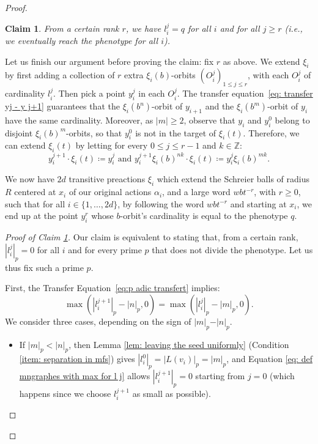 \documentclass[12pt]{article}
\numberwithin{equation}{section}
\newtheorem{claim}[equation]{Claim}
\theoremstyle{definition}
\newenvironment{cproofbis}[1]{\begin{proof}[#1]\renewcommand*{\qedsymbol}{\(\square_\text{claim}\)}}{\end{proof}}
\newcommand{\Z}{\mathbb{Z}}
\newcommand{\abs}[1]{\left\lvert #1\right\rvert}
\begin{document}
\begin{proof}
	
	
	
	
	
	\begin{claim} \label{claim: lij is stationary}
		From a certain rank $r$, we have $l_i^j = q$ for all $i$ and for all $j \geq r$ 
		(i.e., we eventually reach the phenotype for all $i$).
	\end{claim}
	Let us finish our argument before proving the claim: fix $r$ as above.
	We extend $\xi_i$ by first adding a collection of $r$ extra $\xi_i(b)$-orbits $(O_i^j)_{1\leq j\leq r}$, with each $O_i^j$  of cardinality $l_i^j$.
	Then pick a point $y_i^j$ in each $O_i^j$.
	The transfer equation~\eqref{eq: transfer yj - y j+1} guarantees that
	the $\xi_i(b^n)$-orbit of $y_{i+1}$ and the $\xi_i(b^m)$-orbit of $y_i$
	have the same cardinality.
	Moreover, as $\abs{m} \geq 2$, observe that $y_i$ and $y_i^0$ belong to disjoint $\xi_i(b)^m$-orbits, so that $y_i^0$ is not in the target of $\xi_i(t)$.
	Therefore, we can extend $\xi_i(t)$ by letting for every $0 \leq j \leq r-1$ and $k\in\Z$:
	\[
	y_i^{j+1}\cdot \xi_i(t) \coloneqq y_i^j  \text{\ \  and \ \ } y_i^{j+1}\xi_i(b)^{nk} \cdot \xi_i(t) \coloneqq y_i^j\xi_i(b)^{mk}.
	\]

	We now have $2d$ transitive preactions $\xi_i$ which extend 
	the Schreier balls of radius $R$ centered at $x_i$ of our original actions $\alpha_i$, 
	and a large word $wbt^{-r}$, with $r\geq 0$, 
	such that for all $i\in\{1,\dots,2d\}$, by following the word $wbt^{-r}$ and starting at $x_i$, 
	we end up at the point $y^r_i$ whose \( b \)-orbit's cardinality is equal to the phenotype $q$. 

	\begin{cproofbis}{Proof of Claim \ref{claim: lij is stationary}}
		Our claim is equivalent to stating that, from a certain rank, $\abs{l_i^j}_p = 0$ for all $i$ and for every prime $p$ that does not divide the phenotype. Let us thus fix 
		such a prime $p$.
		
		First, the Transfer Equation~\eqref{eq:p adic transfert} implies:
		\begin{equation}\label{eq: def mngraphes with max for l j}
			\max(\abs{l_i^{j+1}}_p - \abs{n}_p,0)
			= \max(\abs{l_i^{j}}_p - \abs{m}_p, 0).
		\end{equation}
		We consider three cases, depending on the sign of $\vert m\vert _p-\vert n\vert_p$.
		
		\begin{itemize}
			\item If $\vert m\vert_p < \vert n\vert _p$, then Lemma \ref{lem: leaving the seed uniformly} (Condition \ref{item: separation in mfs}) 
			gives $\abs{l_i^0}_p = \abs{L(v_i)}_p = \abs{m}_p$, and Equation \eqref{eq: def mngraphes with max for l j} allows $\abs{l_i^{j+1}}_p = 0$ starting from $j = 0$ (which happens since we choose $l_i^{j+1}$ as small as possible).
			

\end{itemize}
\end{cproofbis}
\end{proof}
\end{document}
